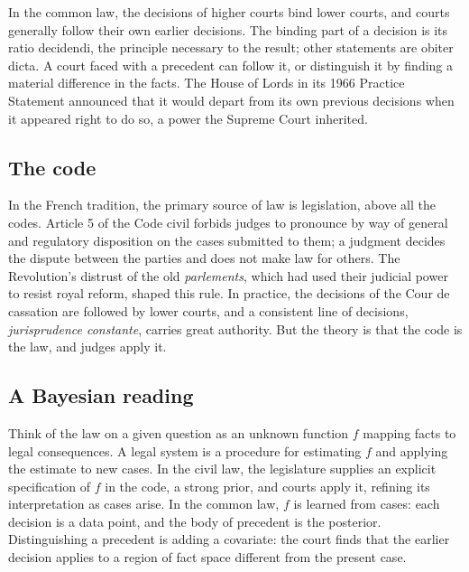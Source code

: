 In the common law, the decisions of higher courts bind lower courts, and courts generally follow their own earlier decisions. The binding part of a decision is its ratio decidendi, the principle necessary to the result; other statements are obiter dicta. A court faced with a precedent can follow it, or distinguish it by finding a material difference in the facts. The House of Lords in its 1966 Practice Statement announced that it would depart from its own previous decisions when it appeared right to do so, a power the Supreme Court inherited.

\subsection{The code}

In the French tradition, the primary source of law is legislation, above all the codes. Article 5 of the Code civil forbids judges to pronounce by way of general and regulatory disposition on the cases submitted to them; a judgment decides the dispute between the parties and does not make law for others. The Revolution's distrust of the old \emph{parlements}, which had used their judicial power to resist royal reform, shaped this rule. In practice, the decisions of the Cour de cassation are followed by lower courts, and a consistent line of decisions, \emph{jurisprudence constante}, carries great authority. But the theory is that the code is the law, and judges apply it.

\subsection{A Bayesian reading}

Think of the law on a given question as an unknown function $f$ mapping facts to legal consequences. A legal system is a procedure for estimating $f$ and applying the estimate to new cases. In the civil law, the legislature supplies an explicit specification of $f$ in the code, a strong prior, and courts apply it, refining its interpretation as cases arise. In the common law, $f$ is learned from cases: each decision is a data point, and the body of precedent is the posterior. Distinguishing a precedent is adding a covariate: the court finds that the earlier decision applies to a region of fact space different from the present case.

